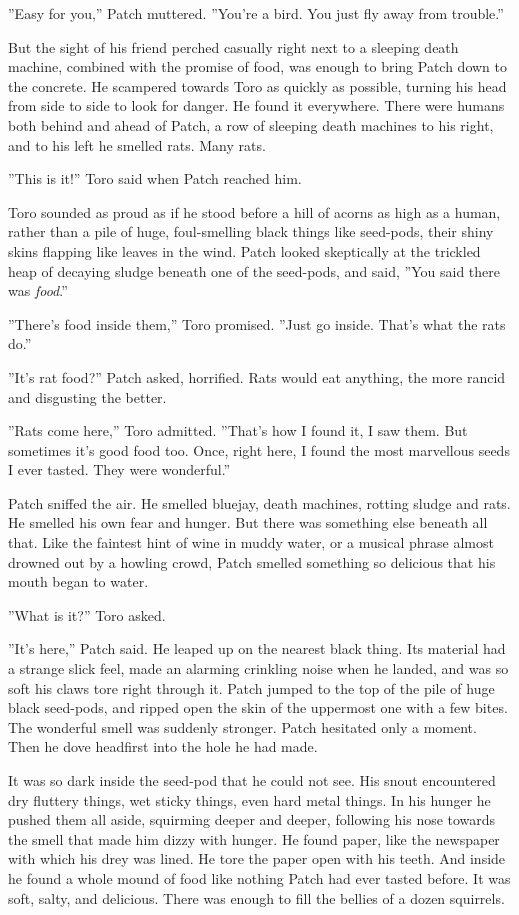 \documentclass[11pt]{article}
\begin{document}
 ''Easy for you,'' Patch muttered. ''You're a bird. You just fly away from trouble.''\par
But the sight of his friend perched casually right next to a sleeping death machine, combined with the promise of food, was enough to bring Patch down to the concrete. He scampered towards Toro as quickly as possible, turning his head from side to side to look for danger. He found it everywhere. There were humans both behind and ahead of Patch, a row of sleeping death machines to his right, and to his left he smelled rats. Many rats.\par
 ''This is it!'' Toro said when Patch reached him.\par
Toro sounded as proud as if he stood before a hill of acorns as high as a human, rather than a pile of huge, foul-smelling black things like seed-pods, their shiny skins flapping like leaves in the wind. Patch looked skeptically at the trickled heap of decaying sludge beneath one of the seed-pods, and said, ''You said there was {\it food}.''\par
 ''There's food inside them,'' Toro promised. ''Just go inside. That's what the rats do.''\par
 ''It's rat food?'' Patch asked, horrified. Rats would eat anything, the more rancid and disgusting the better.\par
 ''Rats come here,'' Toro admitted. ''That's how I found it, I saw them. But sometimes it's good food too. Once, right here, I found the most marvellous seeds I ever tasted. They were wonderful.''\par
 Patch sniffed the air. He smelled bluejay, death machines, rotting sludge and rats. He smelled his own fear and hunger. But there was something else beneath all that. Like the faintest hint of wine in muddy water, or a musical phrase almost drowned out by a howling crowd, Patch smelled something so delicious that his mouth began to water.\par
 ''What is it?'' Toro asked.\par
 ''It's here,'' Patch said. He leaped up on the nearest black thing. Its material had a strange slick feel, made an alarming crinkling noise when he landed, and was so soft his claws tore right through it. Patch jumped to the top of the pile of huge black seed-pods, and ripped open the skin of the uppermost one with a few bites. The wonderful smell was suddenly stronger. Patch hesitated only a moment. Then he dove headfirst into the hole he had made.\par
 It was so dark inside the seed-pod that he could not see. His snout encountered dry fluttery things, wet sticky things, even hard metal things. In his hunger he pushed them all aside, squirming deeper and deeper, following his nose towards the smell that made him dizzy with hunger. He found paper, like the newspaper with which his drey was lined. He tore the paper open with his teeth. And inside he found a whole mound of food like nothing Patch had ever tasted before. It was soft, salty, and delicious. There was enough to fill the bellies of a dozen squirrels.\par
\end{document}

